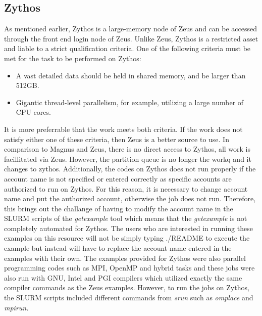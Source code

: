 \subsection{Zythos}
As mentioned earlier, Zythos is a large-memory node of Zeus and can be accessed through the front end login node of Zeus. Unlike Zeus, Zythos is a 
restricted asset and liable to a strict qualification criteria. One of the following criteria must be met for the task to be performed on Zythos:

\begin{itemize}
\item A vast detailed data should be held in shared memory, and be larger than 512GB.
\item Gigantic thread-level parallelism, for example, utilizing a large number of CPU cores.
\end{itemize}

It is more preferrable that the work meets both criteria. If the work does not satisfy either one of these criteria, then Zeus is a better source to
use. In comparison to  Magnus and Zeus, there is no direct access to Zythos, all work is facillitated via Zeus. However, the partition queue is no longer
the workq and it changes to zythos. Additionally, the codes on Zythos does not run properly if the account name is not specified or 
entered correctly as specific accounts are authorized to run on Zythos. For this reason, it is necessary to change account name and put the authorized 
account, otherwise the job does not run. Therefore, this brings out the challange of having to modify the account name in the SLURM scripts of the 
\emph{getexample} tool which means that the \emph{getexample} is not completely automated for Zythos. The users who are interested in running these 
examples on this resource will not be simply typing ./README to execute the example but instead will have to replace the account name entered in the 
examples with their own. The examples provided for Zythos were also parallel programming codes such as MPI, OpenMP and hybrid tasks and these jobs were 
also run with GNU, Intel and PGI compilers which utilized exactly the same compiler commands as the Zeus examples. However, to run the jobs on Zythos, 
the SLURM scripts included different commands from \emph{srun} such as \emph{omplace} and \emph{mpirun.} 

